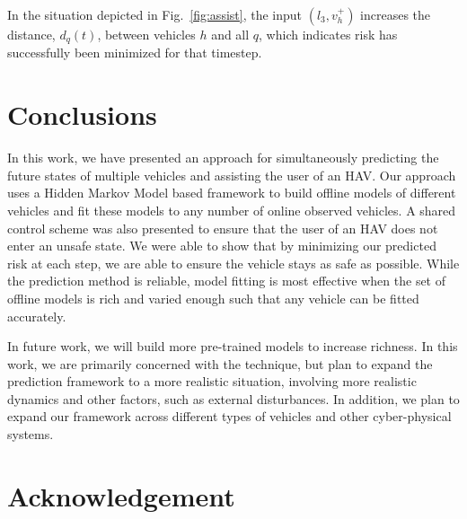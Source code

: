 \documentclass[letterpaper, 10 pt, conference]{ieeeconf}  %
\newcommand\NB[1]{$\spadesuit$\footnote{NB: #1}}
\begin{document}
 In the situation depicted in Fig.~\ref{fig:assist}, the input $(l_3,v_h^+)$ increases the distance, $d_q(t)$, between vehicles $h$ and all $q$, which indicates risk has successfully been minimized for that timestep.


\section{Conclusions} \label{sec:concs}
In this work, we have presented an approach for simultaneously predicting the future states of multiple vehicles and assisting the user of an HAV. Our approach uses a Hidden Markov Model based framework to build offline models of different vehicles and fit these models to any number of online observed vehicles. A shared control scheme was also presented to ensure that the user of an HAV does not enter an unsafe state. We were able to show that by minimizing our predicted risk at each step, we are able to ensure the vehicle stays as safe as possible. While the prediction method is reliable, model fitting is most effective when the set of offline models is rich and varied enough such that any vehicle can be fitted accurately.

In future work, we will build more pre-trained models to increase richness. In this work, we are primarily concerned with the technique, but plan to expand the prediction framework to a more realistic situation, involving more realistic dynamics and other factors, such as external disturbances. In addition, we plan to expand our framework across different types of vehicles and other cyber-physical systems.

\section{Acknowledgement}


%
%
%
\end{document}
